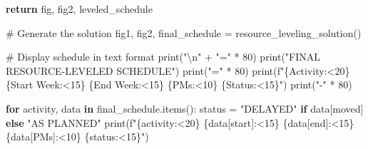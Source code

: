 \documentclass[
  letterpaper,
  DIV=11,
  numbers=noendperiod]{scrreprt}
\newenvironment{Shaded}{\begin{snugshade}}{\end{snugshade}}
\newcommand{\BuiltInTok}[1]{\textcolor[rgb]{0.00,0.23,0.31}{#1}}
\newcommand{\CharTok}[1]{\textcolor[rgb]{0.13,0.47,0.30}{#1}}
\newcommand{\CommentTok}[1]{\textcolor[rgb]{0.37,0.37,0.37}{#1}}
\newcommand{\ControlFlowTok}[1]{\textcolor[rgb]{0.00,0.23,0.31}{\textbf{#1}}}
\newcommand{\DecValTok}[1]{\textcolor[rgb]{0.68,0.00,0.00}{#1}}
\newcommand{\KeywordTok}[1]{\textcolor[rgb]{0.00,0.23,0.31}{\textbf{#1}}}
\newcommand{\NormalTok}[1]{\textcolor[rgb]{0.00,0.23,0.31}{#1}}
\newcommand{\OperatorTok}[1]{\textcolor[rgb]{0.37,0.37,0.37}{#1}}
\newcommand{\SpecialCharTok}[1]{\textcolor[rgb]{0.37,0.37,0.37}{#1}}
\newcommand{\SpecialStringTok}[1]{\textcolor[rgb]{0.13,0.47,0.30}{#1}}
\newcommand{\StringTok}[1]{\textcolor[rgb]{0.13,0.47,0.30}{#1}}
\begin{document}
\begin{Shaded}
\begin{Highlighting}[]
    \ControlFlowTok{return}\NormalTok{ fig, fig2, leveled\_schedule}

\CommentTok{\# Generate the solution}
\NormalTok{fig1, fig2, final\_schedule }\OperatorTok{=}\NormalTok{ resource\_leveling\_solution()}

\CommentTok{\# Display schedule in text format}
\BuiltInTok{print}\NormalTok{(}\StringTok{"}\CharTok{\textbackslash{}n}\StringTok{"} \OperatorTok{+} \StringTok{"="} \OperatorTok{*} \DecValTok{80}\NormalTok{)}
\BuiltInTok{print}\NormalTok{(}\StringTok{"FINAL RESOURCE{-}LEVELED SCHEDULE"}\NormalTok{)}
\BuiltInTok{print}\NormalTok{(}\StringTok{"="} \OperatorTok{*} \DecValTok{80}\NormalTok{)}
\BuiltInTok{print}\NormalTok{(}\SpecialStringTok{f"}\SpecialCharTok{\{}\StringTok{\textquotesingle{}Activity\textquotesingle{}}\SpecialCharTok{:\textless{}20\}}\SpecialStringTok{ }\SpecialCharTok{\{}\StringTok{\textquotesingle{}Start Week\textquotesingle{}}\SpecialCharTok{:\textless{}15\}}\SpecialStringTok{ }\SpecialCharTok{\{}\StringTok{\textquotesingle{}End Week\textquotesingle{}}\SpecialCharTok{:\textless{}15\}}\SpecialStringTok{ }\SpecialCharTok{\{}\StringTok{\textquotesingle{}PMs\textquotesingle{}}\SpecialCharTok{:\textless{}10\}}\SpecialStringTok{ }\SpecialCharTok{\{}\StringTok{\textquotesingle{}Status\textquotesingle{}}\SpecialCharTok{:\textless{}15\}}\SpecialStringTok{"}\NormalTok{)}
\BuiltInTok{print}\NormalTok{(}\StringTok{"{-}"} \OperatorTok{*} \DecValTok{80}\NormalTok{)}

\ControlFlowTok{for}\NormalTok{ activity, data }\KeywordTok{in}\NormalTok{ final\_schedule.items():}
\NormalTok{    status }\OperatorTok{=} \StringTok{"DELAYED"} \ControlFlowTok{if}\NormalTok{ data[}\StringTok{\textquotesingle{}moved\textquotesingle{}}\NormalTok{] }\ControlFlowTok{else} \StringTok{"AS PLANNED"}
    \BuiltInTok{print}\NormalTok{(}\SpecialStringTok{f"}\SpecialCharTok{\{}\NormalTok{activity}\SpecialCharTok{:\textless{}20\}}\SpecialStringTok{ }\SpecialCharTok{\{}\NormalTok{data[}\StringTok{\textquotesingle{}start\textquotesingle{}}\NormalTok{]}\SpecialCharTok{:\textless{}15\}}\SpecialStringTok{ }\SpecialCharTok{\{}\NormalTok{data[}\StringTok{\textquotesingle{}end\textquotesingle{}}\NormalTok{]}\SpecialCharTok{:\textless{}15\}}\SpecialStringTok{ }\SpecialCharTok{\{}\NormalTok{data[}\StringTok{\textquotesingle{}PMs\textquotesingle{}}\NormalTok{]}\SpecialCharTok{:\textless{}10\}}\SpecialStringTok{ }\SpecialCharTok{\{}\NormalTok{status}\SpecialCharTok{:\textless{}15\}}\SpecialStringTok{"}\NormalTok{)}


\end{Highlighting}
\end{Shaded}
\end{document}
